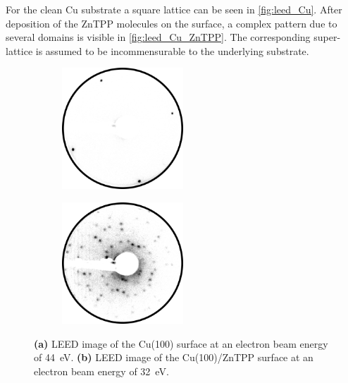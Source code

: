 For the clean Cu substrate a square lattice can be seen in \autoref{fig:leed_Cu}.
After deposition of the ZnTPP molecules on the surface, a complex pattern due to several domains is visible in \autoref{fig:leed_Cu_ZnTPP}.
The corresponding super-lattice is assumed to be incommensurable to the underlying substrate.
\begin{figure}[h]
    \centering
    \begin{subfigure}{0.49\textwidth}
        \centering
        \includegraphics[width = 0.5\textwidth]{Plots/Cu.png}
        \caption{}
        \label{fig:leed_Cu}
    \end{subfigure}
    \hfill
    \begin{subfigure}{0.49\textwidth}
        \centering
        \includegraphics[width = 0.5\textwidth]{Plots/Cu_ZnTPP.png}
        \caption{}
        \label{fig:leed_Cu_ZnTPP}
    \end{subfigure}
    \caption{\textbf{(a)} LEED image of the Cu(100) surface at an electron beam energy of \qty{44}{eV}. \textbf{(b)} LEED image of the Cu(100)/ZnTPP surface at an electron beam energy of \qty{32}{eV}.}
    \label{fig:leed_2}
\end{figure}
\FloatBarrier

\newpage
